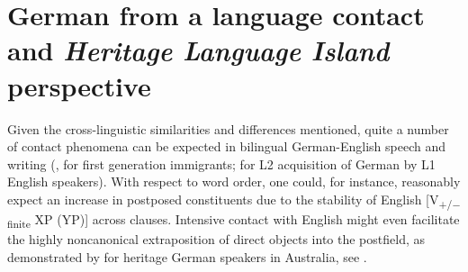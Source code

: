\documentclass[output=paper]{langscibook}
\begin{document}
\section{German from a language contact and \textit{Heritage Language Island} perspective} \label{sec:tsehaye:3}

Given the cross-linguistic similarities and differences mentioned, quite a number of contact phenomena can be expected in bilingual German-English speech and writing (\citealt{LatteyTracy2001, Schmid2011, Tracy2022}, for first generation immigrants; \citealt{VainikkaYoung-Scholten2011} for L2 acquisition of German by L1 English speakers). With respect to word order, one could, for instance, reasonably expect an increase in postposed constituents due to the stability of English [V\textsubscript{+/− finite} XP (YP)] across clauses. Intensive contact with English might even facilitate the highly noncanonical extraposition of direct objects into the postfield, as demonstrated by \citet{Clyne2003} for heritage German speakers in Australia, see .

\z
\end{document}
